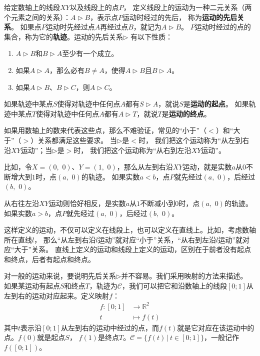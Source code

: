 \documentclass[12pt,UTF8]{ctexbook}
\theoremstyle{definition}
\theoremstyle{plain}
\begin{document}
给定数轴上的线段$XY$以及线段上的点$P$，
定义线段上的运动为一种二元关系（两个元素之间的关系）：$A \triangleright B$，表示点$P$运动时经过的先后，
称为\textbf{运动的先后关系}。
如果点$P$运动时先经过点$A$再经过点$B$，就记为$A \triangleright B$。
$P$运动时经过的点的集合，称为它的\textbf{轨迹}。运动的先后关系$\triangleright$
有以下性质：
\begin{enumerate}
    \item $A \triangleright B$和$B \triangleright A$至少有一个成立。
    \item 如果$A \triangleright A$，那么必有$B\neq A$，使得$A \triangleright B$且$B \triangleright A$。
    \item 如果$A \triangleright B$、$B \triangleright C$，则$A \triangleright C$。
\end{enumerate}
如果轨迹中某点$S$使得对轨迹中任何点$A$都有$S \triangleright A$，就说$S$是\textbf{运动的起点}。
如果轨迹中某点$T$使得对轨迹中任何点$A$都有$A \triangleright T$，就说$T$是\textbf{运动的终点}。

如果用数轴上的数来代表这些点，那么不难验证，常见的“小于”（$<$）和“大于”（$>$）关系都满足这些要求。
当$\triangleright$是$<$时，
我们把这个运动称为“从左到右沿$XY$运动”；当$\triangleright$是$>$时，
我们把这个运动称为“从右到左沿$XY$运动”。

比如，令$X = (0,\,\,0)$、$Y = (1,\,\,0)$，那么从左到右沿$XY$运动，就是实数$a$从$0$不断增大到$1$时，点$(a,\,\,0)$的轨迹。
如果实数$a<b$，点$P$就先经过$(a,\,\,0)$，后经过$(b,\,\,0)$。

从右往左沿$XY$运动则恰好相反，是实数$a$从$1$不断减小到$0$时，点$(a,\,\,0)$的轨迹。
如果实数$a>b$，点$P$就先经过$(a,\,\,0)$，后经过$(b,\,\,0)$。

这样定义的运动，不仅可以定义在线段上，也可以定义在直线上。比如，考虑数轴所在直线$l$，
那么“从左到右沿$l$运动”就对应“小于”关系，“从右到左沿$l$运动”就对应“大于”关系。
直线上定义的运动和线段上定义的运动，区别在于前者没有起点和终点，后者有起点和终点。

对一般的运动来说，要说明先后关系$\triangleright$并不容易。我们采用映射的方法来描述。
如果某运动有起点$S$和终点$T$，轨迹为$\mathcal{C}$，我们可以把它和沿数轴上的线段$[0;1]$从左到右的运动对应起来。定义映射$f$：
\begin{align*}
    f: [0;1] &\rightarrow \mathbb{R}^2  \\
         t \,\,\, &\mapsto f(t) 
\end{align*}
其中$t$表示沿$[0;1]$从左到右的运动中经过的点，而$f(t)$就是它对应在该运动中的点。$f(0)$就是起点$S$，
$f(1)$是终点$T$。$\mathcal{C} = \{f(t)\,|\,t\in[0;1]\}$，一般记作$f([0;1])$。
\end{document}
